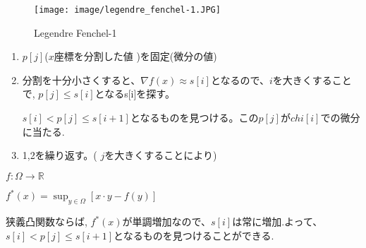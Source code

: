 \documentclass{jsarticle}
\theoremstyle{definition}
\begin{document}
\begin{figure}[htbp]
  \begin{center}
    \texttt{[image: image/legendre\_fenchel-1.JPG]}
    \caption{Legendre Fenchel-1}
  \end{center}
\end{figure}

\begin{enumerate}
   \item $p[j]$($x$座標を分割した値 )を固定(微分の値)
   \item 分割を十分小さくすると、$\nabla f(x) \approx s[i]$となるので、$i$を大きくすることで, $p[j] \leq s[i]$となるs[i]を探す。
   
             $s[i] < p[j] \leq s[i+1]$となるものを見つける。この$p[j]$が$chi[i]$での微分に当たる.
  \item 1,2を繰り返す。( $j$を大きくすることにより) 
\end{enumerate}

\begin{math}
f:\Omega \to \mathbb{R}
\end{math}

\begin{math}
f^{*}(x) = \displaystyle \sup_{y\in \Omega}{[x \cdot y - f(y)]}
\end{math}

 \color{red}狭義凸関数ならば, $f^*(x)$が単調増加なので、$s[i]$は常に増加.よって、  $s[i] < p[j] \leq s[i+1]$となるものを見つけることができる.\color{black}
\end{document}
